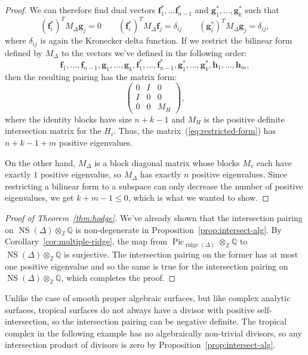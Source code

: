 \documentclass[11pt]{amsart}
\theoremstyle{definition}
\newcommand{\bff}{\mathbf f}
\newcommand{\NS}{\operatorname{NS}}
\newcommand{\Pic}{\operatorname{Pic}}
\newcommand{\QQ}{\mathbb Q}
\newcommand{\ridge}{\operatorname{ridge}}
\newcommand{\ZZ}{\mathbb Z}
\begin{document}
\begin{proof}
We can therefore find dual vectors $\bff_{1}^*, \ldots \bff_{n-1}^*$ and
$\mathbf g_1^*, \ldots, \mathbf g_{k}^*$ such that 
\begin{equation*}
(\mathbf f_i^*)^T M_\Delta \mathbf g_j = 0 \qquad
(\mathbf f_i^*)^T M_\Delta \bff_j = \delta_{ij} \qquad
(\mathbf g_i^*)^T M_\Delta \mathbf g_j = \delta_{ij},
\end{equation*}
where $\delta_{ij}$ is again the Kronecker delta function. If we restrict the
bilinear form defined by $M_\Delta$ to the vectors we've defined in the
following order:
\begin{equation*}
\bff_{1}, \ldots, \bff_{n-1}, \mathbf g_1, \ldots, \mathbf g_k,
\bff_1^*, \ldots, \bff_{n-1}^*, \mathbf g_1^*, \ldots, \mathbf g_k^*,
\mathbf h_1, \ldots, \mathbf h_m,
\end{equation*}
then the resulting pairing has the matrix form:
\begin{equation}\label{eq:restricted-form}
\begin{pmatrix}
0 & I & 0 \\
I & 0 & 0 \\
0 & 0 & M_H
\end{pmatrix},
\end{equation}
where the identity blocks have size $n + k -1$ and $M_H$ is the positive
definite intersection matrix for the $H_i$. Thus, the
matrix~(\ref{eq:restricted-form}) has $n + k
- 1 + m$ positive eigenvalues.

On the other hand, $M_\Delta$ is a block diagonal matrix whose blocks $M_v$ each
have
exactly $1$ positive eigenvalue, so $M_\Delta$ has exactly $n$ positive
eigenvalues. Since restricting a bilinear form to a subspace can only decrease
the number of positive eigenvalues, we get $k + m -1 \leq 0$, which is what we
wanted to show.
\end{proof}

\begin{proof}[Proof of Theorem~\ref{thm:hodge}]
We've already shown that the intersection pairing on $\NS(\Delta) \otimes_\ZZ
\QQ$ is non-degenerate in Proposition~\ref{prop:intersect-alg}. By
Corollary~\ref{cor:multiple-ridge}, the
map from $\Pic_{\ridge(\Delta)} \otimes_{\ZZ} \QQ$ to $\NS(\Delta) \otimes_{\ZZ}
\QQ$ is surjective. The intersection pairing on the former has at most one
positive eigenvalue and so the same is true for the intersection pairing on
$\NS(\Delta) \otimes_{\ZZ} \QQ$, which completes the proof.
\end{proof}

Unlike the case of smooth proper algebraic surfaces, but like complex analytic
surfaces, tropical surfaces do not always have a divisor with positive
self-intersection, so the intersection pairing can be negative definite. The
tropical complex in the following example has no algebraically non-trivial
divisors, so any intersection product of divisors is zero by
Proposition~\ref{prop:intersect-alg}.
\end{document}
